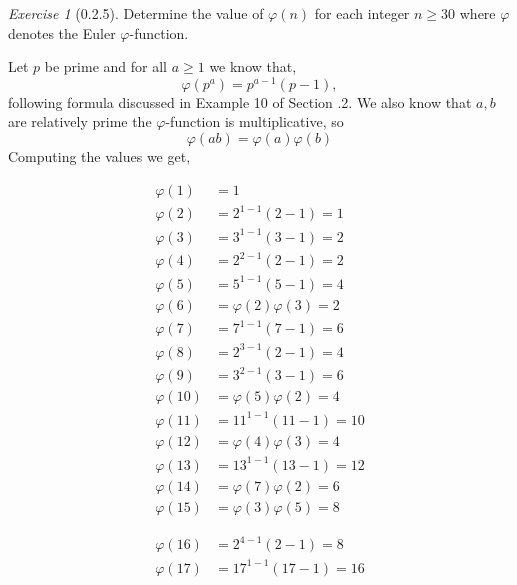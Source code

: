 \documentclass[12pt]{amsart}
\makeatletter
\theoremstyle{remark}
\newtheorem*{exercise}{Exercise}%
\renewenvironment{proof}[1][\proofname]{\par\doublespacing
  \pushQED{\qed}%
  \normalfont \topsep6\p@\@plus6\p@\relax
  \list{}{%
    \settowidth{\leftmargin}{\itshape\proofname:\hskip\labelsep}%
    \setlength{\labelwidth}{0pt}%
    \setlength{\itemindent}{-\leftmargin}%
  }%
  \item[\hskip\labelsep\itshape#1\@addpunct{:}]\ignorespaces
}{%
  \popQED\endlist\@endpefalse
  \singlespacing
}
\theoremstyle{mycomment}
\makeatother
\begin{document}
\begin{exercise}[0.2.5] Determine the value of $\varphi(n)$ for each integer $n \geq 30$ where $\varphi$ denotes the Euler $\varphi$-function.
  \begin{proof}[Solution:] Let $p$ be prime and for all $a \geq 1$ we know that, 
    \begin{equation*}
      \varphi(p^a) = p^{a-1}(p - 1), 
    \end{equation*}
    following formula discussed in Example 10 of Section .2. We also know that $a,b$ are relatively prime the $\varphi$-function is multiplicative, so 
    \begin{equation*}
      \varphi(ab) = \varphi(a)\varphi(b)
    \end{equation*}
    Computing the values we get, 
\begin{center}
  \begin{minipage}{.45\textwidth}
    \begin{align*}
      \varphi(1) &= 1\\
      \varphi(2) &= 2^{1-1}(2-1) = 1\\
      \varphi(3) &= 3^{1-1}(3-1) = 2\\
      \varphi(4) &= 2^{2-1}(2-1) = 2\\
      \varphi(5) &= 5^{1-1}(5-1) = 4\\
      \varphi(6) &= \varphi(2)\varphi(3) = 2\\
      \varphi(7) &= 7^{1-1}(7-1) = 6\\
      \varphi(8) &= 2^{3-1}(2-1) = 4\\
      \varphi(9) &= 3^{2-1}(3-1) = 6\\
      \varphi(10) &= \varphi(5)\varphi(2) = 4\\
      \varphi(11) &= 11^{1-1}(11-1) = 10\\
      \varphi(12) &= \varphi(4)\varphi(3) = 4\\
      \varphi(13) &= 13^{1-1}(13-1) = 12\\
      \varphi(14) &= \varphi(7)\varphi(2) = 6\\
      \varphi(15) &= \varphi(3)\varphi(5) = 8
    \end{align*}
  \end{minipage}
  \hfill
  \begin{minipage}{.45\textwidth}
    \begin{align*}
      \varphi(16) &= 2^{4-1}(2-1) = 8\\
      \varphi(17) &= 17^{1-1}(17-1) = 16\\

\end{align*}
\end{minipage}
\end{center}
\end{proof}
\end{exercise}
\end{document}
